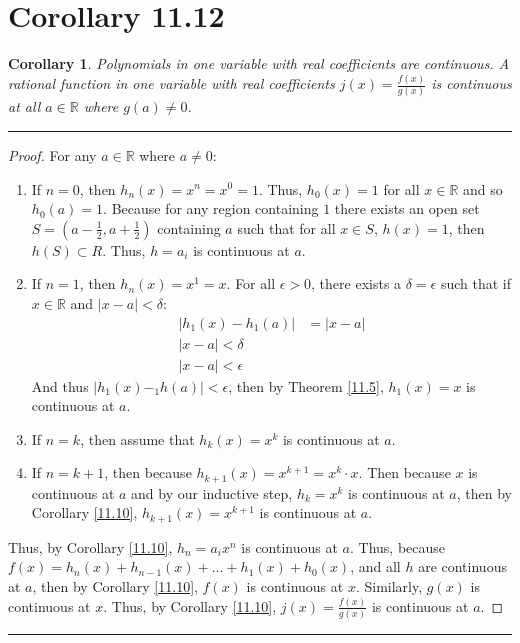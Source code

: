 \documentclass[openany, amssymb, psamsfonts]{amsart}
\newcommand{\bbR}{\mathbb{R}}
\newtheorem{cor}{Corollary}[section]
\theoremstyle{definition}
\numberwithin{equation}{section}
\begin{document}
\section*{Corollary 11.12}
\begin{cor}
	Polynomials in one variable with real coefficients are continuous. A rational function in one variable with real coefficients $j(x) = \frac{f(x)}{g(x)}$ is continuous at all $a \in \bbR$ where $g(a) \neq 0$.
\end{cor} 
\vspace{4pt}     \hrule   \vspace{4pt} \begin{proof}
For any $a\in \bbR$ where $a\neq 0$:
\begin{enumerate}
    \item If $n=0$, then $h_n(x) = x^n = x^0 = 1$. Thus, $h_0(x) = 1$ for all $x\in \bbR$ and so $h_0(a) = 1$. Because for any region containing $1$ there exists an open set $S = (a-\frac{1}{2}, a+ \frac{1}{2})$ containing $a$ such that for all $x\in S$, $h(x) = 1$, then $h(S) \subset R$. Thus, $h = a_i$ is continuous at $a$.
    \item If $n=1$, then $h_n(x) = x^1 = x$. For all $\epsilon>0$, there exists a $\delta= \epsilon$ such that if $x\in \bbR$ and $|x-a|< \delta$:
    \begin{align*}
        |h_1(x) - h_1(a)| &= |x-a|\\
        |x-a| < \delta\\
        |x-a| < \epsilon
    \end{align*}
    And thus $|h_1(x) - _1h(a)|< \epsilon$, then by Theorem \ref{11.5}, $h_1(x) = x$ is continuous at $a$. 
    \item If $n=k$, then assume that $h_k(x) = x^k$ is continuous at $a$.
    \item If $n=k+1$, then because $h_{k+1}(x) = x^{k+1} = x^{k}\cdot x$. Then because $x$ is continuous at $a$ and by our inductive step, $h_k = x^{k}$ is continuous at $a$, then by Corollary \ref{11.10}, $h_{k+1}(x) = x^{k+1}$ is continuous at $a$.
\end{enumerate}
Thus, by Corollary \ref{11.10}, $h_n = a_ix^n$ is continuous at $a$. Thus, because $f(x) = h_n(x) + h_{n-1}(x)+...+ h_1(x) + h_0(x)$, and all $h$ are continuous at $a$, then by Corollary \ref{11.10}, $f(x)$ is continuous at $x$. Similarly, $g(x)$ is continuous at $x$. Thus, by Corollary \ref{11.10}, $j(x) = \frac{f(x)}{g(x)}$ is continuous at $a$. 
\end{proof} \vspace{4pt}     \hrule   \vspace{4pt}
\end{document}
